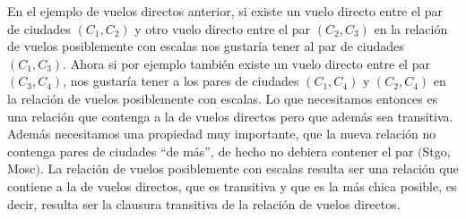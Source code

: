\begin{ejemplo}
En el ejemplo de vuelos directos anterior,
si existe un vuelo directo entre el par de ciudades $(C_1,C_2)$ y otro vuelo directo entre el par $(C_2,C_3)$ en la relación de vuelos posiblemente con escalas nos gustaría tener al par de ciudades $(C_1,C_3)$.
Ahora si por ejemplo también existe un vuelo directo entre el par $(C_3,C_4)$, nos gustaría tener a los pares de ciudades $(C_1,C_4)$ y $(C_2,C_4)$ en la relación de vuelos posiblemente con escalas.
Lo que necesitamos entonces es una relación que contenga a la de vuelos directos pero que además sea transitiva.
Además necesitamos una propiedad muy importante, que la nueva relación no contenga pares de ciudades ``de más'', de hecho no debiera contener el par $($Stgo, Mosc$)$.
La relación de vuelos posiblemente con escalas resulta ser una relación que contiene a la de vuelos directos, que es transitiva y que es la más chica posible, es decir, resulta ser la clausura transitiva de la relación de vuelos directos.


\end{ejemplo}
